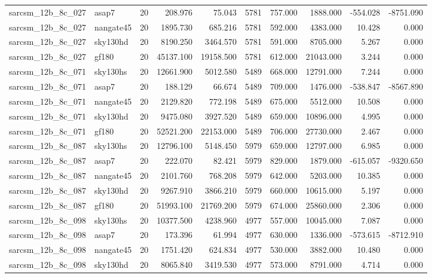 \begin{longtable}{llrrrrrrrr}
sarcsm\_12b\_8c\_027 & asap7 & 20 & 208.976 & 75.043 & 5781 & 757.000 & 1888.000 & -554.028 & -8751.090 \\
sarcsm\_12b\_8c\_027 & nangate45 & 20 & 1895.730 & 685.216 & 5781 & 592.000 & 4383.000 & 10.428 & 0.000 \\
sarcsm\_12b\_8c\_027 & sky130hd & 20 & 8190.250 & 3464.570 & 5781 & 591.000 & 8705.000 & 5.267 & 0.000 \\
sarcsm\_12b\_8c\_027 & gf180 & 20 & 45137.100 & 19158.500 & 5781 & 612.000 & 21043.000 & 3.244 & 0.000 \\
sarcsm\_12b\_8c\_071 & sky130hs & 20 & 12661.900 & 5012.580 & 5489 & 668.000 & 12791.000 & 7.244 & 0.000 \\
sarcsm\_12b\_8c\_071 & asap7 & 20 & 188.129 & 66.674 & 5489 & 709.000 & 1476.000 & -538.847 & -8567.890 \\
sarcsm\_12b\_8c\_071 & nangate45 & 20 & 2129.820 & 772.198 & 5489 & 675.000 & 5512.000 & 10.508 & 0.000 \\
sarcsm\_12b\_8c\_071 & sky130hd & 20 & 9475.080 & 3927.520 & 5489 & 659.000 & 10896.000 & 4.995 & 0.000 \\
sarcsm\_12b\_8c\_071 & gf180 & 20 & 52521.200 & 22153.000 & 5489 & 706.000 & 27730.000 & 2.467 & 0.000 \\
sarcsm\_12b\_8c\_087 & sky130hs & 20 & 12796.100 & 5148.450 & 5979 & 659.000 & 12797.000 & 6.985 & 0.000 \\
sarcsm\_12b\_8c\_087 & asap7 & 20 & 222.070 & 82.421 & 5979 & 829.000 & 1879.000 & -615.057 & -9320.650 \\
sarcsm\_12b\_8c\_087 & nangate45 & 20 & 2101.760 & 768.208 & 5979 & 642.000 & 5203.000 & 10.385 & 0.000 \\
sarcsm\_12b\_8c\_087 & sky130hd & 20 & 9267.910 & 3866.210 & 5979 & 660.000 & 10615.000 & 5.197 & 0.000 \\
sarcsm\_12b\_8c\_087 & gf180 & 20 & 51993.100 & 21769.200 & 5979 & 674.000 & 25860.000 & 2.306 & 0.000 \\
sarcsm\_12b\_8c\_098 & sky130hs & 20 & 10377.500 & 4238.960 & 4977 & 557.000 & 10045.000 & 7.087 & 0.000 \\
sarcsm\_12b\_8c\_098 & asap7 & 20 & 173.396 & 61.994 & 4977 & 630.000 & 1336.000 & -573.615 & -8712.910 \\
sarcsm\_12b\_8c\_098 & nangate45 & 20 & 1751.420 & 624.834 & 4977 & 530.000 & 3882.000 & 10.480 & 0.000 \\
sarcsm\_12b\_8c\_098 & sky130hd & 20 & 8065.840 & 3419.530 & 4977 & 573.000 & 8791.000 & 4.714 & 0.000 \\

\end{longtable}
